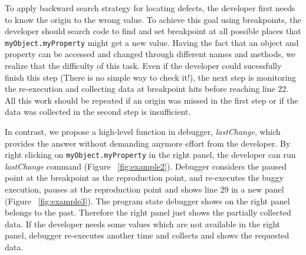 \documentclass[preprint]{sigplanconf}
\begin{document}
To apply backward search strategy for locating defects, the developer first needs to know the origin to the wrong value. To achieve this goal using breakpoints, the developer should search code to find and set breakpoint at all possible places that \texttt{myObject.myProperty} might get a new value. Having the fact that an object and property can be accessed and changed through different names and methods, we realize that the difficulty of this task. Even if the developer could sucessfully finish this step (There is no simple way to check it!), the next step is monitoring the re-execution and collecting data at breakpoint hits before reaching line 22. All this work should be repeated if an origin was missed in the first step or if the data was collected in the second step is insufficient.

In contrast, we propose a high-level function in debugger, \textit{lastChange}, which provides the answer without demanding anymore effort from the developer. By right clicking on \texttt{myObject.myProperty} in the right panel, the developer can run \textit{lastChange} command (Figure ~\ref{fig:example2}). Debugger considers the paused point at the breakpoint as the reproduction point, and re-executes the buggy execution, pauses at the reproduction point and shows line 29 in a new panel (Figure ~\ref{fig:example3}). The program state debugger shows on the right panel belongs to the past. Therefore the right panel just shows the partially collected data. If the developer needs some values which are not available in the right panel, debugger re-executes another time and collects and shows the requested data. 
\end{document}
